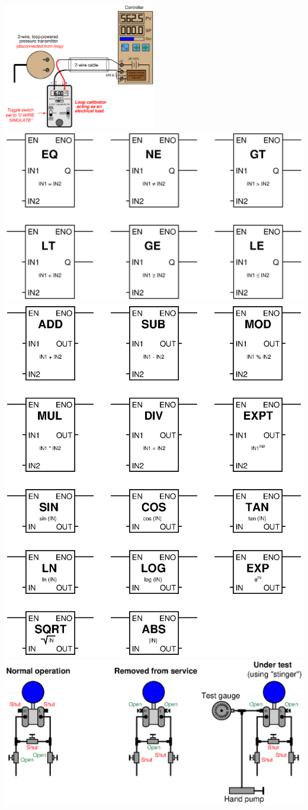 \documentclass[10pt,a5paper]{article}
\begin{document}
\includegraphics[width=0.5\textwidth]{current31.eps}
\includegraphics[width=1\textwidth]{plc_048.eps}
\includegraphics[width=1\textwidth]{plc_052.eps}
\includegraphics[width=1\textwidth]{pressure76.eps}
\end{document}
